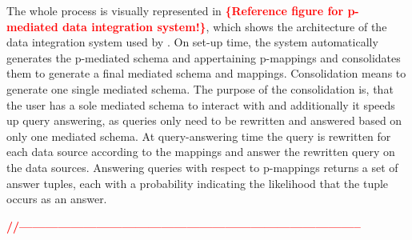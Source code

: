The whole process is visually represented in \textcolor{red}{\textbf{\{Reference figure for p-mediated data integration system!\}}}, which shows the architecture of the data integration system used by \cite{DasSarma:2008:BPD:1376616.1376702}.
On set-up time, the system automatically generates the p-mediated schema and appertaining p-mappings and consolidates them to generate a final mediated schema and mappings. Consolidation means to generate one single mediated schema. The purpose of the consolidation is, that the user has a sole mediated schema to interact with and additionally it speeds up query answering, as queries only need to be rewritten and answered based on only one mediated schema. At query-answering time the query is rewritten for each data source according to the mappings and answer the rewritten query on the data sources. Answering queries with respect to p-mappings returns a set of answer tuples, each with a probability indicating the likelihood that the tuple occurs as an answer.

\textcolor{red}{\textbf{//--------------------------------------------------------------------------------\\}}\\